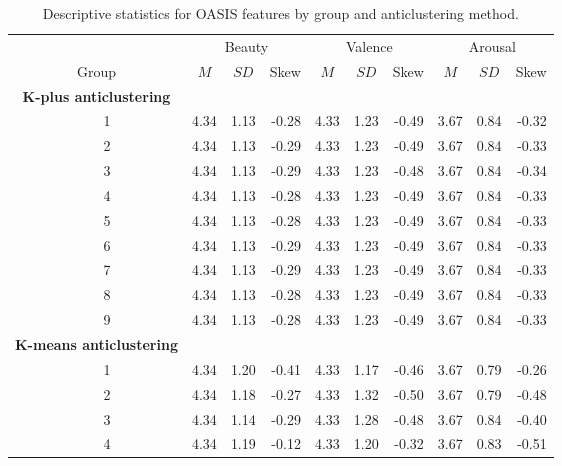 \documentclass[
  man,floatsintext]{apa7}
\begin{document}
\begin{table}[tbp]

\begin{center}
\begin{threeparttable}

\caption{\label{tab:unnamed-chunk-2}Descriptive statistics for OASIS features by group and anticlustering method.}

\begin{tabular}{crrrrrrrrr}
\toprule
 & \multicolumn{3}{c}{Beauty} & \multicolumn{3}{c}{Valence} & \multicolumn{3}{c}{Arousal} \\
\cmidrule(r){2-4} \cmidrule(r){5-7} \cmidrule(r){8-10}
Group & \multicolumn{1}{c}{$M$} & \multicolumn{1}{c}{$\mathit{SD}$} & \multicolumn{1}{c}{Skew} & \multicolumn{1}{c}{$M$} & \multicolumn{1}{c}{$\mathit{SD}$} & \multicolumn{1}{c}{Skew} & \multicolumn{1}{c}{$M$} & \multicolumn{1}{c}{$\mathit{SD}$} & \multicolumn{1}{c}{Skew}\\
\midrule
\textbf{K-plus anticlustering} &  &  &  &  &  &  &  &  & \\
\ \ \ 1 & 4.34 & 1.13 & -0.28 & 4.33 & 1.23 & -0.49 & 3.67 & 0.84 & -0.32\\
\ \ \ 2 & 4.34 & 1.13 & -0.29 & 4.33 & 1.23 & -0.49 & 3.67 & 0.84 & -0.33\\
\ \ \ 3 & 4.34 & 1.13 & -0.29 & 4.33 & 1.23 & -0.48 & 3.67 & 0.84 & -0.34\\
\ \ \ 4 & 4.34 & 1.13 & -0.28 & 4.33 & 1.23 & -0.49 & 3.67 & 0.84 & -0.33\\
\ \ \ 5 & 4.34 & 1.13 & -0.28 & 4.33 & 1.23 & -0.49 & 3.67 & 0.84 & -0.33\\
\ \ \ 6 & 4.34 & 1.13 & -0.29 & 4.33 & 1.23 & -0.49 & 3.67 & 0.84 & -0.33\\
\ \ \ 7 & 4.34 & 1.13 & -0.29 & 4.33 & 1.23 & -0.49 & 3.67 & 0.84 & -0.33\\
\ \ \ 8 & 4.34 & 1.13 & -0.28 & 4.33 & 1.23 & -0.49 & 3.67 & 0.84 & -0.33\\
\ \ \ 9 & 4.34 & 1.13 & -0.28 & 4.33 & 1.23 & -0.49 & 3.67 & 0.84 & -0.33\\
\textbf{K-means anticlustering} &  &  &  &  &  &  &  &  & \\
\ \ \ 1 & 4.34 & 1.20 & -0.41 & 4.33 & 1.17 & -0.46 & 3.67 & 0.79 & -0.26\\
\ \ \ 2 & 4.34 & 1.18 & -0.27 & 4.33 & 1.32 & -0.50 & 3.67 & 0.79 & -0.48\\
\ \ \ 3 & 4.34 & 1.14 & -0.29 & 4.33 & 1.28 & -0.48 & 3.67 & 0.84 & -0.40\\
\ \ \ 4 & 4.34 & 1.19 & -0.12 & 4.33 & 1.20 & -0.32 & 3.67 & 0.83 & -0.51\\

\end{tabular}
\end{threeparttable}
\end{center}
\end{table}
\end{document}
